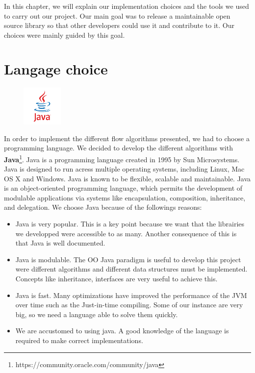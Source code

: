 In this chapter, we will explain our implementation choices and the tools we used to carry out our project. Our main goal was to release a maintainable open source library so that other developers could use it and contribute to it. Our choices were mainly guided by this goal.

\section{Langage choice}

\begin{figure}
	\vspace{-8mm}
	\includegraphics[width =2cm]{images/Java_logo.png}
\end{figure}

In order to implement the different flow algorithms presented, we had to choose a programming language. We decided to develop the different algorithms with \textbf{Java}\footnote{https://community.oracle.com/community/java}. Java is a programming language created in 1995 by Sun Microsystems. Java is designed to run acress multiple operating systems, including Linux, Mac OS X and Windows. Java is known to be flexible, scalable and maintainable. Java is an object-oriented programming language, which permits the development of modulable applications via systems like encapsulation, composition, inheritance, and delegation. We choose Java because of the followings reasons:
\begin{itemize}
	\item Java is very popular. This is a key point because we want that the librairies we developped were accessible to as many. Another consequence of this is that Java is well documented.
	\item Java is modulable. The OO Java paradigm is useful to develop this project were different algorithms and different data structures must be implemented. Concepts like inheritance, interfaces are very useful to achieve this.
	\item Java is fast. Many optimizations have improved the performance of the JVM over time such as the Just-in-time compiling. Some of our instance are very big, so we need a language able to solve them quickly.
	\item We are accustomed to using java. A good knowledge of the language is required to make correct implementations.
\end{itemize}


